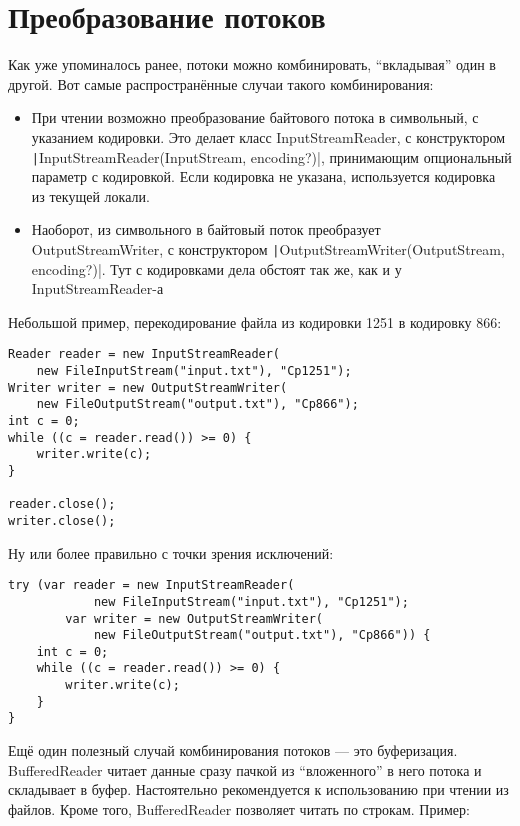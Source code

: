 \documentclass[a5paper]{article}
\begin{document}
\section{Преобразование потоков}

Как уже упоминалось ранее, потоки можно комбинировать, ``вкладывая'' один в другой. Вот самые распространённые случаи такого комбинирования:

\begin{itemize}
	\item При чтении возможно преобразование байтового потока в символьный, с указанием кодировки. Это делает класс InputStreamReader, с конструктором \texttt|InputStreamReader(InputStream, encoding?)|, принимающим опциональный параметр с кодировкой. Если кодировка не указана, используется кодировка из текущей локали.
	\item Наоборот, из символьного в байтовый поток преобразует OutputStreamWriter, с конструктором \texttt|OutputStreamWriter(OutputStream, encoding?)|. Тут с кодировками дела обстоят так же, как и у InputStreamReader-а
\end{itemize}

Небольшой пример, перекодирование файла из кодировки 1251 в кодировку 866:

\begin{verbatim}
Reader reader = new InputStreamReader(
    new FileInputStream("input.txt"), "Cp1251");
Writer writer = new OutputStreamWriter(
    new FileOutputStream("output.txt"), "Cp866");
int c = 0;
while ((c = reader.read()) >= 0) {
    writer.write(c);
}

reader.close();
writer.close();
\end{verbatim}

Ну или более правильно с точки зрения исключений:

\begin{verbatim}
try (var reader = new InputStreamReader(
            new FileInputStream("input.txt"), "Cp1251");
        var writer = new OutputStreamWriter(
            new FileOutputStream("output.txt"), "Cp866")) {
    int c = 0;
    while ((c = reader.read()) >= 0) {
        writer.write(c);
    }
}
\end{verbatim}

Ещё один полезный случай комбинирования потоков --- это буферизация. BufferedReader читает данные сразу пачкой из ``вложенного'' в него потока и складывает в буфер. Настоятельно рекомендуется к использованию при чтении из файлов. Кроме того, BufferedReader позволяет читать по строкам. Пример:
\end{document}
